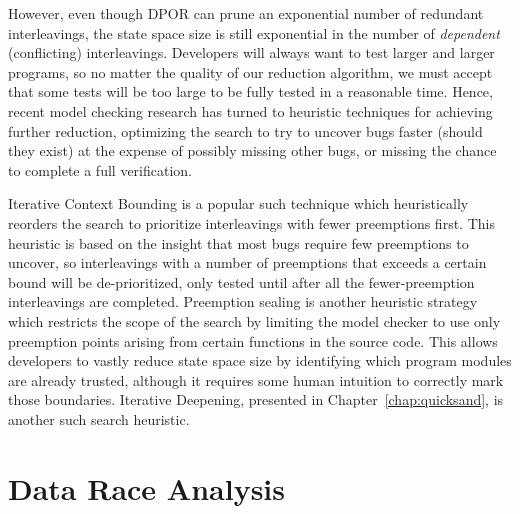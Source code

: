 However, even though DPOR can prune an exponential number of redundant interleavings, the state space size is still exponential in the number of {\em dependent} (conflicting) interleavings.
Developers will always want to test larger and larger programs, so no matter the quality of our reduction algorithm,
we must accept that some tests will be too large to be fully tested in a reasonable time.
Hence, recent model checking research has turned to heuristic techniques for achieving further reduction,
optimizing the search to try to uncover bugs faster (should they exist)
at the expense of possibly missing other bugs,
or missing the chance to complete a full verification.

Iterative Context Bounding \cite{chess-icb} is a popular such technique which heuristically reorders the search to prioritize interleavings with fewer preemptions first.
This heuristic is based on the insight that most bugs require few preemptions to uncover, so interleavings with a number of preemptions that exceeds a certain bound will be de-prioritized, only tested until after all the fewer-preemption interleavings are completed.
Preemption sealing \cite{sealing} is another heuristic strategy which restricts the scope of the search by limiting the model checker to use only preemption points arising from certain functions in the source code.
This allows developers to vastly reduce state space size by identifying which program modules are already trusted,
although it requires some human intuition to correctly mark those boundaries.
Iterative Deepening, presented in Chapter~\ref{chap:quicksand}, is another such search heuristic.


\section{Data Race Analysis}
\label{sec:background-datarace}

